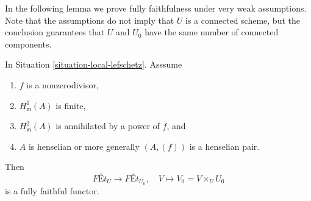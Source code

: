 \noindent
In the following lemma we prove fully faithfulness under very weak assumptions.
Note that the assumptions do not imply that $U$ is a connected scheme, but
the conclusion guarantees that $U$ and $U_0$ have the same number of
connected components.

\begin{lemma}
\label{lemma-fully-faithful-minimal}
\begin{reference}
\cite[Corollary 1.11]{Bhatt-local}
\end{reference}
In Situation \ref{situation-local-lefschetz}. Asssume
\begin{enumerate}
\item $f$ is a nonzerodivisor,
\item $H^1_\mathfrak m(A)$ is finite,
\item $H^2_\mathfrak m(A)$ is annihilated by a power of $f$, and
\item $A$ is henselian or more generally $(A, (f))$ is a henselian pair.
\end{enumerate}
Then
$$
\textit{F\'Et}_U \longrightarrow \textit{F\'Et}_{U_0},\quad
V \longmapsto V_0 = V \times_U U_0
$$
is a fully faithful functor.
\end{lemma}

